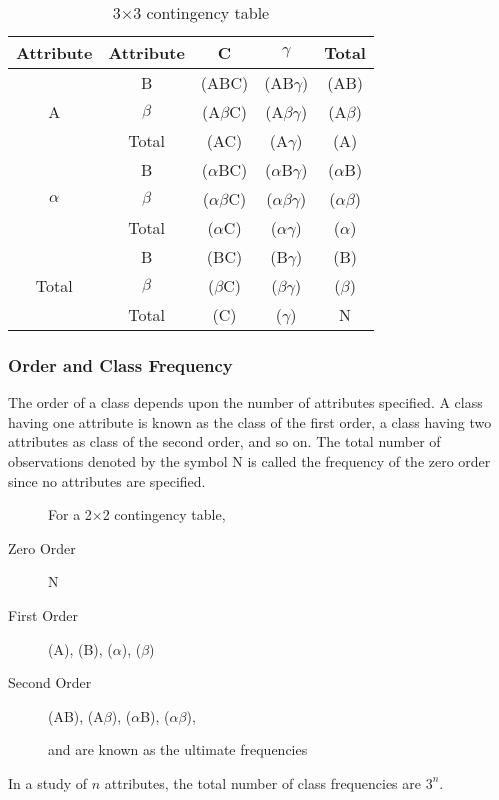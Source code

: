 \documentclass[
10pt, %
a4paper, %
]{report}
\begin{document}
\begin{table}
\begin{center}
\begin{tabular}{|c|c|c|c|c|}
\hline
Attribute & Attribute & C & \(\gamma\) & Total \\ \hline
\multirow{3}{*}{A} & B & (ABC) & (AB\(\gamma\)) & (AB) \\ \cline{2-5} 
 & \(\beta\) & (A\(\beta\)C) & (A\(\beta\gamma\)) & (A\(\beta\)) \\ \cline{2-5} 
 & Total & (AC) & (A\(\gamma\)) & (A) \\ \hline
\multirow{3}{*}{\(\alpha\)} & B & (\(\alpha\)BC) & (\(\alpha\)B\(\gamma\)) & (\(\alpha\)B) \\ \cline{2-5} 
 & \(\beta\) & (\(\alpha\beta\)C) & (\(\alpha\beta\gamma\)) & (\(\alpha\beta\)) \\ \cline{2-5} 
 & Total & (\(\alpha\)C) & (\(\alpha\gamma\)) & (\(\alpha\)) \\ \hline
\multirow{3}{*}{Total} & B & (BC) & (B\(\gamma\)) & (B) \\ \cline{2-5} 
 & \(\beta\) & (\(\beta\)C) & (\(\beta\gamma\)) & (\(\beta\)) \\ \cline{2-5} 
 & Total & (C) & (\(\gamma\)) & N \\ \hline
\end{tabular}
\end{center}
\caption{3\(\times\)3 contingency table}
\label{tab:3x3}
\end{table}

\subsubsection*{Order and Class Frequency}
The order of a class depends upon the number of
attributes specified. A class having one attribute is known as the class of the first order, a class having two attributes as class of the second order, and so on. The total number of observations denoted by the symbol N is called the frequency of the zero order since no attributes are specified.

\begin{description}
\item[] For a 2\(\times\)2 contingency table,
\item[Zero Order] N
\item[First Order] (A), (B), (\(\alpha\)), (\(\beta\))
\item[Second Order] (AB), (A\(\beta\)), (\(\alpha\)B), (\(\alpha\beta\)),
\item[] and are known as the ultimate frequencies
\end{description}
In a study of \(n\) attributes, the total number of class frequencies are \(3^n\).
\end{document}
